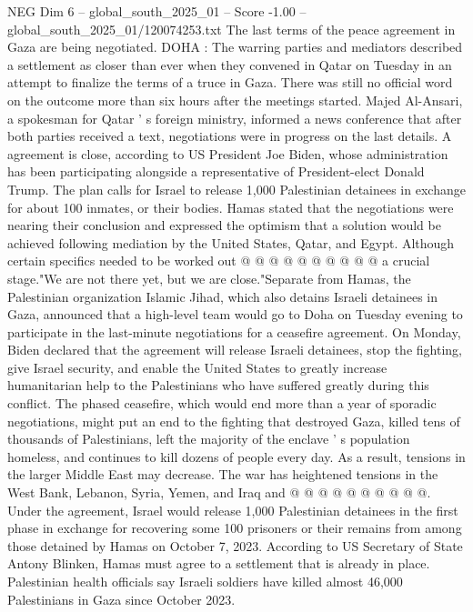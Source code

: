 \begin{textsample}{NEG Dim 6 – global\_south\_2025\_01 – Score -1.00 – global\_south\_2025\_01/120074253.txt}  \label{ex:f6_neg_093}
The last terms of the peace agreement in Gaza are being negotiated.
DOHA : The warring parties and mediators described a settlement as closer than ever when they convened in Qatar on Tuesday in an attempt to finalize the terms of a truce in Gaza.
There was still no official word on the outcome more than six hours after the meetings started.
Majed Al-Ansari, a spokesman for Qatar ' s foreign ministry, informed a news conference that after both parties received a text, negotiations were in progress on the last details.
A agreement is close, according to US President Joe Biden, whose administration has been participating alongside a representative of President-elect Donald Trump.
The plan calls for Israel to release 1,000 Palestinian detainees in exchange for about 100 inmates, or their bodies.
Hamas stated that the negotiations were nearing their conclusion and expressed the optimism that a solution would be achieved following mediation by the United States, Qatar, and Egypt.
Although certain specifics needed to be worked out @ @ @ @ @ @ @ @ @ @ a crucial stage."We are not there yet, but we are close."Separate from Hamas, the Palestinian organization Islamic Jihad, which also detains Israeli detainees in Gaza, announced that a high-level team would go to Doha on Tuesday evening to participate in the last-minute negotiations for a ceasefire agreement.
On Monday, Biden declared that the agreement will release Israeli detainees, stop the fighting, give Israel security, and enable the United States to greatly increase humanitarian help to the Palestinians who have suffered greatly during this conflict.
The phased ceasefire, which would end more than a year of sporadic negotiations, might put an end to the fighting that destroyed Gaza, killed tens of thousands of Palestinians, left the majority of the enclave ' s population homeless, and continues to kill dozens of people every day.
As a result, tensions in the larger Middle East may decrease.
The war has heightened tensions in the West Bank, Lebanon, Syria, Yemen, and Iraq and @ @ @ @ @ @ @ @ @ @.
Under the agreement, Israel would release 1,000 Palestinian detainees in the first phase in exchange for recovering some 100 prisoners or their remains from among those detained by Hamas on October 7, 2023.
According to US Secretary of State Antony Blinken, Hamas must agree to a settlement that is already in place.
Palestinian health officials say Israeli soldiers have killed almost 46,000 Palestinians in Gaza since October 2023.

\end{textsample}
